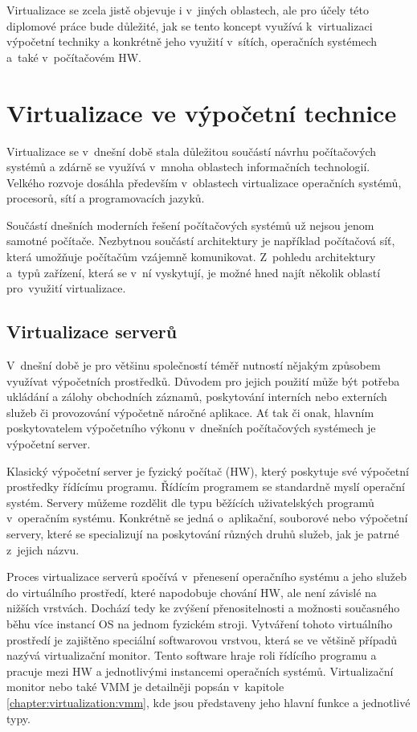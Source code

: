 Virtualizace se zcela jistě objevuje i v~jiných oblastech, ale pro účely této diplomové práce bude důležité, jak se tento koncept
využívá k~virtualizaci výpočetní techniky a konkrétně jeho využití v~sítích, operačních systémech a~také v~počítačovém HW. 
\section{Virtualizace ve výpočetní technice}
\label{chapter:virtualization:it}
Virtualizace se v~dnešní době stala důležitou součástí návrhu počítačových systémů a zdárně se využívá v~mnoha oblastech informačních
technologií. Velkého rozvoje dosáhla především v~oblastech virtualizace operačních systémů, procesorů, sítí a programovacích
jazyků.

Součástí dnešních moderních řešení počítačových systémů už nejsou jenom samotné počítače. Nezbytnou součástí architektury je
například počítačová síť, která umožňuje počítačům vzájemně komunikovat. Z~pohledu architektury a~typů zařízení, která se v~ní
vyskytují, je možné hned najít několik oblastí pro~využití virtualizace.
\subsection{Virtualizace serverů}
\label{chapter:virtualization:it:servers}
V~dnešní době je pro většinu společností téměř nutností nějakým způsobem využívat výpočetních prostředků. Důvodem pro jejich
použití může být potřeba ukládání a zálohy obchodních záznamů, poskytování interních nebo externích služeb či provozování
výpočetně náročné aplikace. Ať tak či onak, hlavním poskytovatelem výpočetního výkonu v~dnešních počítačových systémech je
výpočetní server.

Klasický výpočetní server je fyzický počítač (HW), který poskytuje své výpočetní prostředky řídícímu programu. Řídícím programem
se standardně myslí operační systém. Servery můžeme rozdělit dle typu běžících uživatelských programů v~operačním systému.
Konkrétně se jedná o~aplikační, souborové nebo výpočetní servery, které se specializují na poskytování různých druhů služeb,
jak je patrné z~jejich názvu.

Proces virtualizace serverů spočívá v~přenesení operačního systému a jeho služeb do virtuálního prostředí, které napodobuje
chování HW, ale není závislé na nižších vrstvách. Dochází tedy ke zvýšení přenositelnosti a možnosti současného běhu více 
instancí OS na jednom fyzickém stroji. Vytváření tohoto virtuálního prostředí je zajištěno speciální softwarovou vrstvou, která
se ve většině případů nazývá virtualizační monitor. Tento software hraje roli řídícího programu a pracuje mezi HW a jednotlivými
instancemi operačních systémů. Virtualizační monitor nebo také VMM je detailněji popsán v~kapitole \ref{chapter:virtualization:vmm},
kde jsou představeny jeho hlavní funkce a jednotlivé typy.

